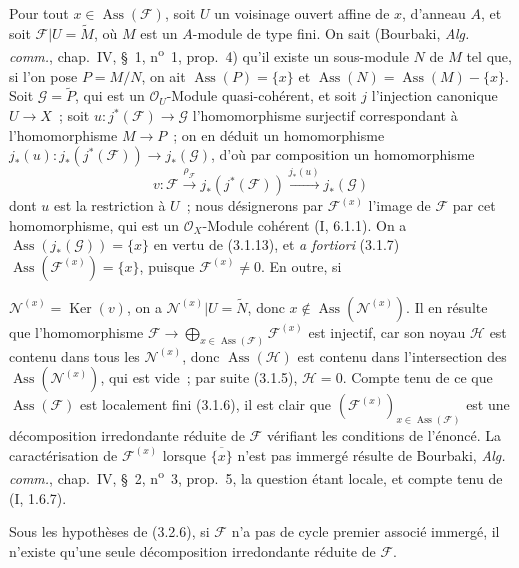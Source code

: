 Pour tout $x\in\operatorname{Ass}(\mathcal F)$, soit $U$ un voisinage ouvert
affine de $x$, d'anneau $A$, et soit $\mathcal F|U=\widetilde M$, où $M$ est
un $A$-module de type fini. On sait (Bourbaki, \emph{Alg. comm.}, chap.~IV,
\S~1, n\textsuperscript{o}~1, prop.~4) qu'il existe un sous-module $N$ de $M$
tel que, si l'on pose $P=M/N$, on ait
$\operatorname{Ass}(P)=\{x\}$ et
$\operatorname{Ass}(N)=\operatorname{Ass}(M)-\{x\}$. Soit
$\mathcal G=\widetilde P$, qui est un $\mathcal O_U$-Module quasi-cohérent, et
soit $j$ l'injection canonique $U\to X$~; soit
$u:j^*(\mathcal F)\to\mathcal G$ l'homomorphisme surjectif correspondant à
l'homomorphisme $M\to P$~; on en déduit un homomorphisme
$j_*(u):j_*(j^*(\mathcal F))\to j_*(\mathcal G)$, d'où par composition un
homomorphisme
\[
v:\mathcal F\xrightarrow{\rho_{\mathcal F}}j_*(j^*(\mathcal F))
\xrightarrow{j_*(u)}j_*(\mathcal G)
\]
dont $u$ est la restriction à $U$~; nous désignerons par
$\mathcal F^{(x)}$ l'image de $\mathcal F$ par cet homomorphisme, qui est un
$\mathcal O_X$-Module cohérent (I, 6.1.1). On a
$\operatorname{Ass}(j_*(\mathcal G))=\{x\}$ en vertu de (3.1.13), et
\emph{a fortiori} (3.1.7)
$\operatorname{Ass}(\mathcal F^{(x)})=\{x\}$, puisque
$\mathcal F^{(x)}\ne0$. En outre, si

$\mathcal N^{(x)}=\operatorname{Ker}(v)$, on a
$\mathcal N^{(x)}|U=\widetilde N$, donc
$x\notin\operatorname{Ass}(\mathcal N^{(x)})$. Il en résulte que
l'homomorphisme
$\mathcal F\to\bigoplus_{x\in\operatorname{Ass}(\mathcal F)}
\mathcal F^{(x)}$ est injectif, car son noyau $\mathcal H$ est contenu dans
tous les $\mathcal N^{(x)}$, donc $\operatorname{Ass}(\mathcal H)$ est contenu
dans l'intersection des $\operatorname{Ass}(\mathcal N^{(x)})$, qui est vide~;
par suite (3.1.5), $\mathcal H=0$. Compte tenu de ce que
$\operatorname{Ass}(\mathcal F)$ est localement fini (3.1.6), il est clair que
$(\mathcal F^{(x)})_{x\in\operatorname{Ass}(\mathcal F)}$ est une
décomposition irredondante réduite de $\mathcal F$ vérifiant les conditions de
l'énoncé. La caractérisation de $\mathcal F^{(x)}$ lorsque
$\overline{\{x\}}$ n'est pas immergé résulte de Bourbaki,
\emph{Alg. comm.}, chap.~IV, \S~2, n\textsuperscript{o}~3, prop.~5, la question
étant locale, et compte tenu de (I, 1.6.7).

\begin{corollary}[3.2.7]
\label{IV.2.3.2.7-fr}
Sous les hypothèses de (3.2.6), si $\mathcal F$ n'a pas de cycle premier
associé immergé, il n'existe qu'une seule décomposition irredondante réduite de
$\mathcal F$.
\end{corollary}

